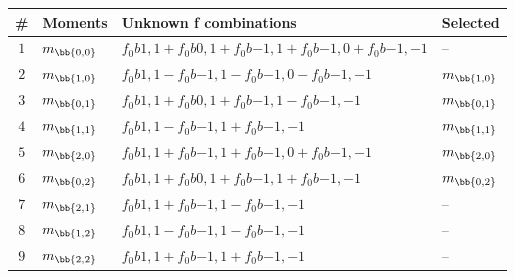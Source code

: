 \begin{table}[!h]
\centering
\begin{tabular}{c l l l}
\toprule
\# & Moments & Unknown f combinations & Selected\\
\midrule
\multirow{ 1}{*}{$1$} & \multirow{ 1}{*}{$m_\bb{0,0}$} & $f_0b{1,1}+f_0b{0,1}+f_0b{-1,1}+f_0b{-1,0}+f_0b{-1,-1}$ & \multirow{ 1}{*}{--}\\ 
\midrule
\multirow{ 1}{*}{$2$} & \multirow{ 1}{*}{$m_\bb{1,0}$} & $f_0b{1,1}-f_0b{-1,1}-f_0b{-1,0}-f_0b{-1,-1}$ & \multirow{ 1}{*}{$m_\bb{1,0}$}\\ 
\midrule
\multirow{ 1}{*}{$3$} & \multirow{ 1}{*}{$m_\bb{0,1}$} & $f_0b{1,1}+f_0b{0,1}+f_0b{-1,1}-f_0b{-1,-1}$ & \multirow{ 1}{*}{$m_\bb{0,1}$}\\ 
\midrule
\multirow{ 1}{*}{$4$} & \multirow{ 1}{*}{$m_\bb{1,1}$} & $f_0b{1,1}-f_0b{-1,1}+f_0b{-1,-1}$ & \multirow{ 1}{*}{$m_\bb{1,1}$}\\ 
\midrule
\multirow{ 1}{*}{$5$} & \multirow{ 1}{*}{$m_\bb{2,0}$} & $f_0b{1,1}+f_0b{-1,1}+f_0b{-1,0}+f_0b{-1,-1}$ & \multirow{ 1}{*}{$m_\bb{2,0}$}\\ 
\midrule
\multirow{ 1}{*}{$6$} & \multirow{ 1}{*}{$m_\bb{0,2}$} & $f_0b{1,1}+f_0b{0,1}+f_0b{-1,1}+f_0b{-1,-1}$ & \multirow{ 1}{*}{$m_\bb{0,2}$}\\ 
\midrule
\multirow{ 1}{*}{$7$} & \multirow{ 1}{*}{$m_\bb{2,1}$} & $f_0b{1,1}+f_0b{-1,1}-f_0b{-1,-1}$ & \multirow{ 1}{*}{--}\\ 
\midrule
\multirow{ 1}{*}{$8$} & \multirow{ 1}{*}{$m_\bb{1,2}$} & $f_0b{1,1}-f_0b{-1,1}-f_0b{-1,-1}$ & \multirow{ 1}{*}{--}\\ 
\midrule
\multirow{ 1}{*}{$9$} & \multirow{ 1}{*}{$m_\bb{2,2}$} & $f_0b{1,1}+f_0b{-1,1}+f_0b{-1,-1}$ & \multirow{ 1}{*}{--}\\ 
\bottomrule
\end{tabular}\end{table}
